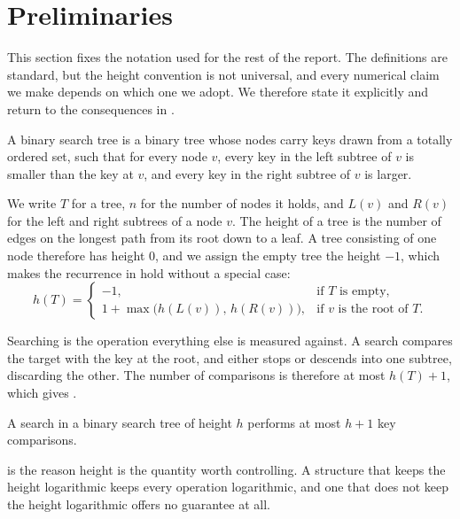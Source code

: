 \section{Preliminaries}
\label{sec:prelim}

This section fixes the notation used for the rest of the report. The definitions
are standard, but the height convention is not universal, and every numerical
claim we make depends on which one we adopt. We therefore state it explicitly and
return to the consequences in .

\begin{definition}
\label{def:bst}
A binary search tree is a binary tree whose nodes carry keys drawn from a totally
ordered set, such that for every node $v$, every key in the left subtree of $v$ is
smaller than the key at $v$, and every key in the right subtree of $v$ is larger.
\end{definition}

We write $T$ for a tree, $n$ for the number of nodes it holds, and $L(v)$ and
$R(v)$ for the left and right subtrees of a node $v$. The height of a tree is the
number of edges on the longest path from its root down to a leaf. A tree
consisting of one node therefore has height $0$, and we assign the empty tree the
height $-1$, which makes the recurrence in  hold without a
special case:
\begin{equation}
  \label{eq:heightrec}
  h(T) =
  \begin{cases}
    -1, & \text{if } T \text{ is empty},\\
    1 + \max\bigl(h(L(v)),\, h(R(v))\bigr), & \text{if } v \text{ is the root of } T.
  \end{cases}
\end{equation}

Searching is the operation everything else is measured against. A search compares
the target with the key at the root, and either stops or descends into one
subtree, discarding the other. The number of comparisons is therefore at most
$h(T)+1$, which gives .

\begin{proposition}
\label{prop:searchcost}
A search in a binary search tree of height $h$ performs at most $h+1$ key
comparisons.
\end{proposition}

 is the reason height is the quantity worth controlling. A
structure that keeps the height logarithmic keeps every operation logarithmic,
and one that does not keep the height logarithmic offers no guarantee at all.

